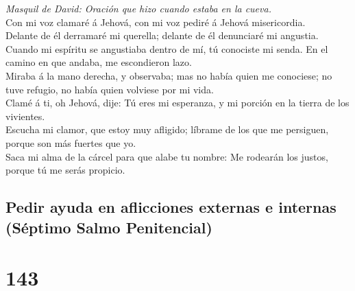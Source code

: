  \emph{Masquil de David: Oración que hizo cuando estaba en
la cueva.}\\
Con mi voz clamaré á Jehová, con mi voz pediré á Jehová misericordia.\\
 Delante de él derramaré mi querella; delante de él
denunciaré mi angustia.\\
 Cuando mi espíritu se angustiaba dentro de mí, tú conociste
mi senda. En el camino en que andaba, me escondieron lazo.\\
 Miraba á la mano derecha, y observaba; mas no había quien
me conociese; no tuve refugio, no había quien volviese por mi vida.\\
 Clamé á ti, oh Jehová, dije: Tú eres mi esperanza, y mi
porción en la tierra de los vivientes.\\
 Escucha mi clamor, que estoy muy afligido; líbrame de los
que me persiguen, porque son más fuertes que yo.\\
 Saca mi alma de la cárcel para que alabe tu nombre: Me
rodearán los justos, porque tú me serás propicio.

\hypertarget{pedir-ayuda-en-aflicciones-externas-e-internas-suxe9ptimo-salmo-penitencial}{%
\subsection{Pedir ayuda en aflicciones externas e internas (Séptimo
Salmo
Penitencial)}\label{pedir-ayuda-en-aflicciones-externas-e-internas-suxe9ptimo-salmo-penitencial}}

\hypertarget{section-142}{%
\section{143}\label{section-142}}

